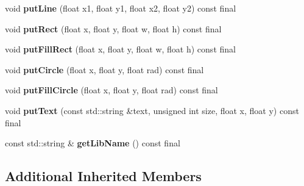 \begin{DoxyCompactItemize}
void {\bfseries put\+Line} (float x1, float y1, float x2, float y2) const final
\item 
\mbox{\label{classArcade_1_1Display_1_1SFML_a177bbd0afd21be8a66bc970b8007e7cd}} 
void {\bfseries put\+Rect} (float x, float y, float w, float h) const final
\item 
\mbox{\label{classArcade_1_1Display_1_1SFML_acb25e2345face39175b447a06b8b8dc1}} 
void {\bfseries put\+Fill\+Rect} (float x, float y, float w, float h) const final
\item 
\mbox{\label{classArcade_1_1Display_1_1SFML_a46143388a143114f2513a408d2237d7c}} 
void {\bfseries put\+Circle} (float x, float y, float rad) const final
\item 
\mbox{\label{classArcade_1_1Display_1_1SFML_a6ca75268a9d059b40c64098841bd2475}} 
void {\bfseries put\+Fill\+Circle} (float x, float y, float rad) const final
\item 
\mbox{\label{classArcade_1_1Display_1_1SFML_a88bb03b669afd0df748fd66bf24d45f3}} 
void {\bfseries put\+Text} (const std\+::string \&text, unsigned int size, float x, float y) const final
\item 
\mbox{\label{classArcade_1_1Display_1_1SFML_a8c323cea968403cb2edf791d37dc7887}} 
const std\+::string \& {\bfseries get\+Lib\+Name} () const final
\end{DoxyCompactItemize}
\subsection*{Additional Inherited Members}
